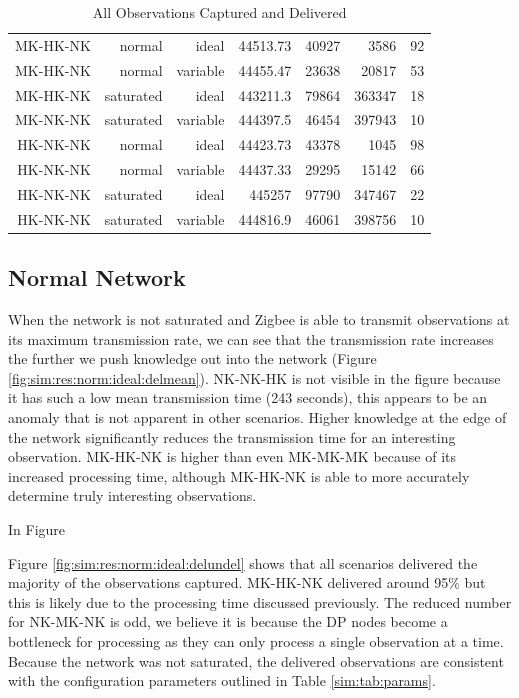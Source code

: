 \begin{landscape}
\begin{table}[htbp]
\begin{tabular}{rrrrrrr}
\rowcolor{Gray}
    MK-HK-NK & normal & ideal & 44513.73 & 40927 & 3586  & 92 \\
\rowcolor{Gray}
    MK-HK-NK & normal & variable & 44455.47 & 23638 & 20817 & 53 \\
\rowcolor{Gray}
    MK-HK-NK & saturated & ideal & 443211.3 & 79864 & 363347 & 18 \\
\rowcolor{Gray}
    MK-NK-NK & saturated & variable & 444397.5 & 46454 & 397943 & 10 \\
    HK-NK-NK & normal & ideal & 44423.73 & 43378 & 1045  & 98 \\
    HK-NK-NK & normal & variable & 44437.33 & 29295 & 15142 & 66 \\
    HK-NK-NK & saturated & ideal & 445257 & 97790 & 347467 & 22 \\
    HK-NK-NK & saturated & variable & 444816.9 & 46061 & 398756 & 10 \\
    \bottomrule

    \end{tabular}%
    \caption{All Observations Captured and Delivered}
\end{table}%
\label{tab:delnum}%
\end{landscape}

\subsection{Normal Network}

When the network is not saturated and Zigbee is able to transmit observations at its maximum transmission rate, we can see that the transmission rate increases the further we push knowledge out into the network (Figure \ref{fig:sim:res:norm:ideal:delmean}). NK-NK-HK is not visible in the figure because it has such a low mean transmission time (243 seconds), this appears to be an anomaly that is not apparent in other scenarios. Higher knowledge at the edge of the network significantly reduces the transmission time for an interesting observation. MK-HK-NK is higher than even MK-MK-MK because of its increased processing time, although MK-HK-NK is able to more accurately determine truly interesting observations.

In Figure 

Figure \ref{fig:sim:res:norm:ideal:delundel} shows that all scenarios delivered the majority of the observations captured. MK-HK-NK delivered around 95\% but this is likely due to the processing time discussed previously. The reduced number for NK-MK-NK is odd, we believe it is because the DP nodes become a bottleneck for processing as they can only process a single observation at a time. Because the network was not saturated, the delivered observations are consistent with the configuration parameters outlined in Table \ref{sim:tab:params}.

